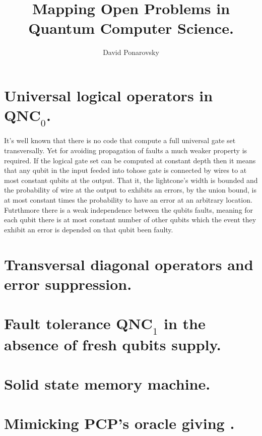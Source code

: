 \documentclass[manuscript,screen,review]{acmart}
\begin{document}

\title{ Mapping Open Problems in Quantum Computer Science.}
\author{David Ponarovsky}
\maketitle

\newcommand*{\Mbas}{\mathcal{X}^\prime}
\newcommand*{\bas}{\mathcal{X}}
\newcommand*{\sMbas}{\Mbas}
\newcommand*{\QQ}{C_{X}/C_{Z}^\perp }
\newcommand*{\trig}{ Triorthogonal }
\newcommand*{\Hyp}{ Hyperproduct }
\newcommand*{\Cin}{ C_{\text{initial}} }
\newcommand*{\Ctan}{ C_{\text{Tan}} }

\section{Universal logical operators in $\textbf{QNC}_{0}$.  }
It's well known that there is no code that compute a full universal gate set transversally. Yet for avoiding propagation of faults a much weaker property is required. If the logical gate set can be computed at constant depth then it means that any qubit in the input feeded into tohose gate is connected by wires to at most constant qubits at the output. That it, the lightcone's width is bounded and the probability of wire at the output to exhibits an errors, by the union bound, is at most constant times the probability to have an error at an arbitrary location. Futrthmore there is a weak independence between the qubits faults, meaning for each qubit there is at most constant number of other qubits which the event they exhibit an error is depended on that qubit been faulty.  
\section{Transversal diagonal operators and error suppression.  }
\section{Fault tolerance $\textbf{QNC}_{1}$ in the absence of fresh qubits supply.  }
\section{Solid state memory machine.}
\section{Mimicking PCP's oracle giving .}
\printbibliography
\end{document}
